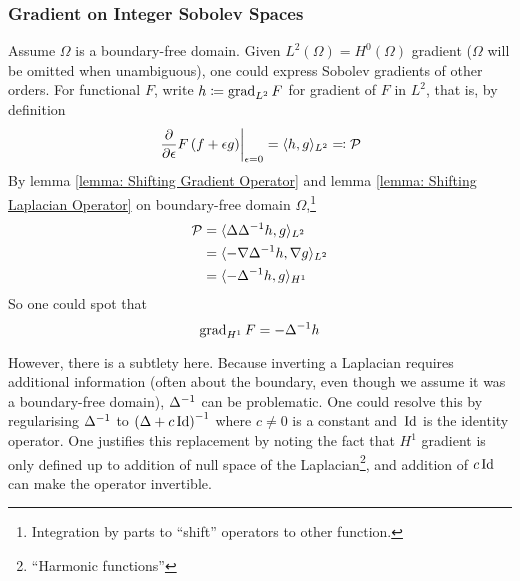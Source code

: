 \documentclass[../dissertation.tex]{subfiles}
\begin{document}
\subsubsection{Gradient on Integer Sobolev Spaces}
\label{sct: Gradient on Integer Sobolev Spaces}
Assume $\Omega$ is a boundary-free domain.
Given $L^2(\Omega) = H^0(\Omega)$ gradient ($\Omega$ will be omitted when unambiguous), one could express Sobolev gradients of other orders.
For functional $F$, write $h \coloneqq \operatorname{grad}_{L^2} F$ for gradient of $F$ in $L^2$, that is, by definition
\begin{equation}
    \left.\frac{\partial}{\partial \epsilon} F \left( f + \epsilon g \right)\right|_{\epsilon = 0} = \langle h, g \rangle_{L^2} \eqqcolon \mathcal{P}
    \label{equ: L2 Gradient Explicit Form}
\end{equation}
By lemma \ref{lemma: Shifting Gradient Operator} and lemma \ref{lemma: Shifting Laplacian Operator} on boundary-free domain $\Omega$,\footnote{Integration by parts to ``shift'' operators to other function.}
\begin{align*}
    \mathcal{P} &= \langle \Delta \Delta^{-1} h, g \rangle_{L^2} \\
    &= \langle -\nabla \Delta^{-1} h, \nabla g \rangle_{L^2} \\
    &= \langle -\Delta^{-1} h, g \rangle_{H^1}
\end{align*}
So one could spot that
\begin{equation}
    \operatorname{grad}_{H^1} F = -\Delta^{-1} h
    \label{equ: H1 Gradient}
\end{equation}
\begin{remark}
However, there is a subtlety here.
Because inverting a Laplacian requires additional information
(often about the boundary, even though we assume it was a boundary-free domain),
$\Delta^{-1}$ can be problematic.
One could resolve this by regularising $\Delta^{-1}$ to $\left(\Delta + c \, \text{Id}\right)^{-1}$
where $c\neq 0$ is a constant and $\, \text{Id}$ is the identity operator.
One justifies this replacement by noting the fact that $H^1$ gradient is only defined up to
addition of null space of the Laplacian\footnote{``Harmonic functions''}, and addition of $c \, \text{Id}$ can make the operator invertible.
\end{remark}
\end{document}
